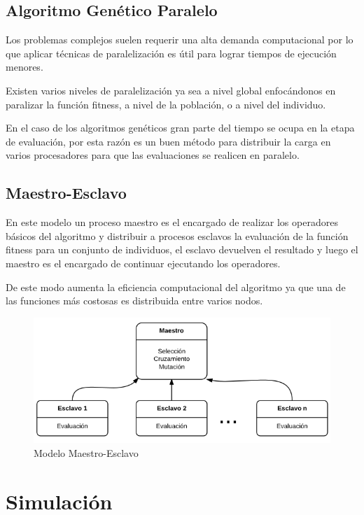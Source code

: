 \subsection{Algoritmo Genético Paralelo}
Los problemas complejos suelen requerir una alta demanda computacional por lo que aplicar técnicas de paralelización es útil para lograr tiempos de ejecución menores.

Existen varios niveles de paralelización ya sea a nivel global enfocándonos en paralizar la función fitness, a nivel de la población, o a nivel del individuo. \citep{Nesmachnow2002}

En el caso de los algoritmos genéticos gran parte del tiempo se ocupa en la etapa de evaluación, por esta razón es un buen método para distribuir la carga en varios procesadores para que las evaluaciones se realicen en paralelo.


\subsection{Maestro-Esclavo}

En este modelo un proceso maestro es el encargado de realizar los operadores básicos del algoritmo y distribuir a procesos esclavos la evaluación de la función fitness para un conjunto de individuos, el esclavo devuelven el resultado y luego el maestro es el encargado de continuar ejecutando los operadores.

De este modo aumenta la eficiencia computacional del algoritmo ya que una de las funciones más costosas es distribuida entre varios nodos.

\begin{figure}[H]
	\centering
	\includegraphics[width=0.7\linewidth]{Figures/diagrama-master-slave}
	\caption[Modelo Maestro-Esclavo]{Modelo Maestro-Esclavo}
	\label{fig:diagrama-master-slave}
\end{figure}



\section{Simulación}

